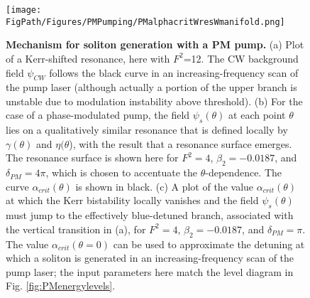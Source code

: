 \begin{figure}[htpb]
	\begin{center}
		\texttt{[image: \\FigPath/Figures/PMPumping/PMalphacritWresWmanifold.png]}
	\end{center}
	\caption[Mechanism for soliton generation with a PM pump]{\textbf{Mechanism for soliton generation with a PM pump.} (a) Plot of a Kerr-shifted resonance, here with $F^2$=12. The CW background field $\psi_{CW}$ follows the black curve in an increasing-frequency scan of the pump laser (although actually a portion of the upper branch is unstable due to modulation instability above threshold). (b) For the case of a phase-modulated pump, the field $\psi_s(\theta)$ at each point $\theta$ lies on a qualitatively similar resonance that is defined locally by $\gamma(\theta)$ and $\eta(\theta$), with the result that a resonance surface emerges. The resonance surface is shown here for $F^2=4$, $\beta_2=-0.0187$, and $\delta_{PM}=4\pi$, which is chosen to accentuate the $\theta$-dependence. The curve $\alpha_{crit}(\theta)$ is shown in black. (c) A plot of the value $\alpha_{crit}(\theta)$ at which the Kerr bistability locally vanishes and the field $\psi_s(\theta)$ must jump to the effectively blue-detuned branch, associated with the vertical transition in (a), for $F^2=4$, $\beta_2=-0.0187$, and $\delta_{PM}=\pi$. The value $\alpha_{crit}(\theta=0)$ can be used to approximate the detuning at which a soliton is generated in an increasing-frequency scan of the pump laser; the input parameters here match the level diagram in Fig. \ref{fig:PMenergylevels}.}
	\label{fig:PMalphacrit}
\end{figure} 


